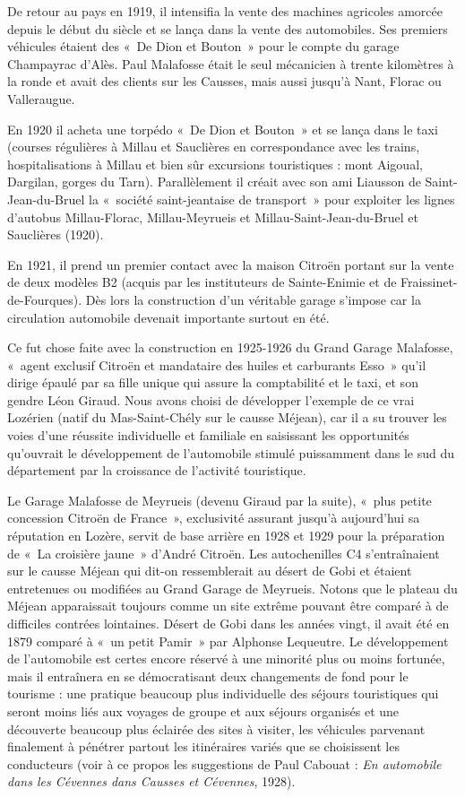 De retour au pays en 1919,
il intensifia la vente des machines agricoles amorcée depuis le début du siècle et se lança dans
la vente des automobiles. Ses premiers véhicules étaient des «~De Dion et Bouton~» pour le compte
du garage Champayrac d’Alès. Paul Malafosse était le seul mécanicien à trente kilomètres à la
ronde et avait des clients sur les Causses, mais aussi jusqu’à Nant, Florac ou Valleraugue.

En 1920
il acheta une torpédo «~De Dion et Bouton~» et se lança dans le taxi (courses régulières à Millau et
Sauclières en correspondance avec les trains, hospitalisations à Millau et bien sûr excursions
touristiques : mont Aigoual, Dargilan, gorges du Tarn). Parallèlement il créait avec son ami
Liausson de Saint-Jean-du-Bruel la «~société saint-jeantaise de transport~» pour exploiter les
lignes d’autobus Millau-Florac, Millau-Meyrueis et Millau-Saint-Jean-du-Bruel et Sauclières
(1920).

En 1921, il prend un premier contact avec la maison Citroën portant sur la vente de deux
modèles B2 (acquis par les instituteurs de Sainte-Enimie et de Fraissinet-de-Fourques). Dès lors la
construction d’un véritable garage s’impose car la circulation automobile devenait importante
surtout en été.

Ce fut chose faite avec la construction en 1925-1926 du Grand Garage Malafosse,
«~agent exclusif Citroën et mandataire des huiles et carburants Esso~» qu’il dirige épaulé par sa
fille unique qui assure la comptabilité et le taxi, et son gendre Léon Giraud. Nous avons choisi
de développer l’exemple de ce vrai Lozérien (natif du Mas-Saint-Chély sur le causse Méjean), car
il a su trouver les voies d’une réussite individuelle et familiale en saisissant les opportunités
qu’ouvrait le développement de l’automobile stimulé puissamment dans le sud du département
par la croissance de l’activité touristique.

Le Garage Malafosse de Meyrueis (devenu Giraud par la
suite), «~plus petite concession Citroën de France~», exclusivité assurant jusqu’à aujourd’hui sa
réputation en Lozère, servit de base arrière en 1928 et 1929 pour la préparation de «~La croisière
jaune~» d’André Citroën. Les autochenilles C4 s’entraînaient sur le causse Méjean qui dit-on
ressemblerait au désert de Gobi et étaient entretenues ou modifiées au Grand Garage de Meyrueis.
Notons que le plateau du Méjean apparaissait toujours comme un site extrême pouvant être
comparé à de difficiles contrées lointaines. Désert de Gobi dans les années vingt, il avait été en
1879 comparé à «~un petit Pamir~» par Alphonse Lequeutre. Le développement de l’automobile
est certes encore réservé à une minorité plus ou moins fortunée, mais il entraînera en se
démocratisant deux changements de fond pour le tourisme : une pratique beaucoup plus
individuelle des séjours touristiques qui seront moins liés aux voyages de groupe et aux séjours
organisés et une découverte beaucoup plus éclairée des sites à visiter, les véhicules parvenant
finalement à pénétrer partout les itinéraires variés que se choisissent les conducteurs (voir à ce
propos les suggestions de Paul Cabouat : \textit{En automobile dans les Cévennes dans Causses et Cévennes},
1928).

